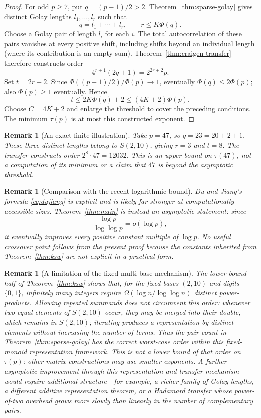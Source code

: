 \documentclass[11pt]{article}
\newtheorem{remark}[theorem]{Remark}
\newcommand{\scale}{\Phi}
\begin{document}
\begin{proof}
For odd $p\ge7$, put $q=(p-1)/2>2$. Theorem~\ref{thm:sparse-golay}
gives distinct Golay lengths $l_1,\ldots,l_r$ such that
\[
q=l_1+\cdots+l_r,\qquad r\le K\scale(q).
\]
Choose a Golay pair of length $l_i$ for each $i$. The total autocorrelation
of these pairs vanishes at every positive shift, including shifts beyond
an individual length (where its contribution is an empty sum).
Theorem~\ref{thm:craigen-transfer} therefore constructs order
\[
4^{r+1}(2q+1)=2^{2r+2}p.
\]
Set $t=2r+2$. Since $\scale((p-1)/2)/\scale(p)\to1$, eventually
$\scale(q)\le2\scale(p)$; also $\scale(p)\ge1$ eventually. Hence
\[
t\le2K\scale(q)+2\le(4K+2)\scale(p).
\]
Choose $C=4K+2$ and enlarge the threshold to cover the preceding conditions.
The minimum $\tau(p)$ is at most this constructed exponent.
\end{proof}

\begin{remark}[An exact finite illustration]
Take $p=47$, so $q=23=20+2+1$. These three distinct lengths belong to
$S(2,10)$, giving $r=3$ and $t=8$. The transfer constructs order
$2^8\cdot47=12032$. This is an upper bound on $\tau(47)$, not a computation
of its minimum or a claim that $47$ is beyond the asymptotic threshold.
\end{remark}

\begin{remark}[Comparison with the recent logarithmic bound]
Du and Jiang's formula \eqref{eq:dujiang} is explicit and is likely far stronger at computationally accessible sizes.  Theorem~\ref{thm:main} is instead an asymptotic statement: since
\[
\frac{\log p}{\log\log p}=o(\log p),
\]
it eventually improves every positive constant multiple of $\log p$.  No useful crossover point follows from the present proof because the constants inherited from Theorem~\ref{thm:ksw} are not explicit in a practical form.
\end{remark}

\begin{remark}[A limitation of the fixed multi-base mechanism]\label{rem:optimality}
The lower-bound half of Theorem~\ref{thm:ksw} shows that, for the fixed bases $(2,10)$ and digits $\{0,1\}$, infinitely many integers require
$\Omega(\log n/\log\log n)$ distinct power-products.  Allowing repeated summands does not circumvent this order: whenever two equal elements of $S(2,10)$ occur, they may be merged into their double, which remains in $S(2,10)$; iterating produces a representation by distinct elements without increasing the number of terms.  Thus the pair count in Theorem~\ref{thm:sparse-golay} has the correct worst-case order within this fixed-monoid representation framework. This is not a lower bound of that order on $\tau(p)$: other matrix constructions may use smaller exponents.  A further asymptotic improvement through this representation-and-transfer mechanism would require additional structure---for example, a richer family of Golay lengths, a different additive representation theorem, or a Hadamard transfer whose power-of-two overhead grows more slowly than linearly in the number of complementary pairs.
\end{remark}
\end{document}
